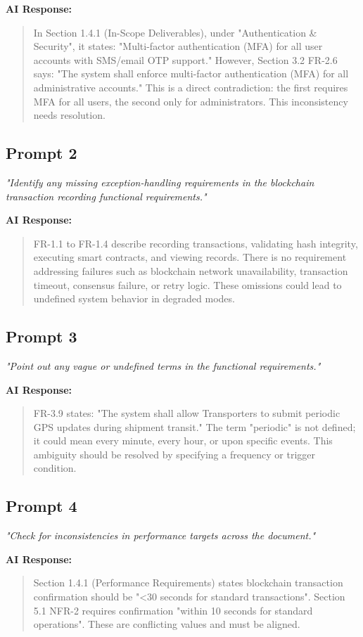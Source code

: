 \documentclass[11pt,a4paper]{article}
\begin{document}
\textbf{AI Response:}
\begin{quote}
In Section 1.4.1 (In-Scope Deliverables), under "Authentication \& Security", it states: "Multi-factor authentication (MFA) for all user accounts with SMS/email OTP support." However, Section 3.2 FR-2.6 says: "The system shall enforce multi-factor authentication (MFA) for all administrative accounts." This is a direct contradiction: the first requires MFA for all users, the second only for administrators. This inconsistency needs resolution.
\end{quote}

\subsection*{Prompt 2}
\textit{"Identify any missing exception-handling requirements in the blockchain transaction recording functional requirements."}

\textbf{AI Response:}
\begin{quote}
FR-1.1 to FR-1.4 describe recording transactions, validating hash integrity, executing smart contracts, and viewing records. There is no requirement addressing failures such as blockchain network unavailability, transaction timeout, consensus failure, or retry logic. These omissions could lead to undefined system behavior in degraded modes.
\end{quote}

\subsection*{Prompt 3}
\textit{"Point out any vague or undefined terms in the functional requirements."}

\textbf{AI Response:}
\begin{quote}
FR-3.9 states: "The system shall allow Transporters to submit periodic GPS updates during shipment transit." The term "periodic" is not defined; it could mean every minute, every hour, or upon specific events. This ambiguity should be resolved by specifying a frequency or trigger condition.
\end{quote}

\subsection*{Prompt 4}
\textit{"Check for inconsistencies in performance targets across the document."}

\textbf{AI Response:}
\begin{quote}
Section 1.4.1 (Performance Requirements) states blockchain transaction confirmation should be "<30 seconds for standard transactions". Section 5.1 NFR-2 requires confirmation "within 10 seconds for standard operations". These are conflicting values and must be aligned.
\end{quote}
\end{document}
